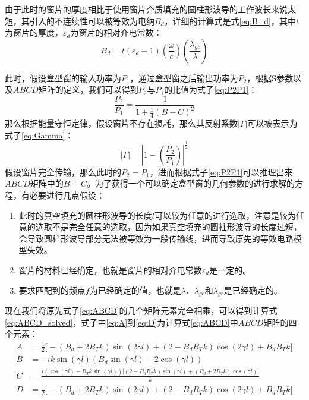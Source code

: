 \documentclass[master]{thesis-uestc}
\begin{document}
由于此时的窗片的厚度相比于使用窗片介质填充的圆柱形波导的工作波长来说太短，其引入的不连续性可以被等效为电纳$B_{d}$，详细的计算式是式\ref{eq:B_d}，其中$t$为窗片的厚度，$\varepsilon_d$为窗片的相对介电常数：
\begin{equation}\label{eq:B_d}
    B_{d} = t (\varepsilon_d - 1) \left( \frac{\omega}{c} \right) \left( \frac{\lambda_{gc}}{\lambda} \right)
\end{equation}

此时，假设盒型窗的输入功率为$P_{1}$，通过盒型窗之后输出功率为$P_{2}$，根据S参数以及$ABCD$矩阵的定义，我们可以得到$P_{2}$与$P_{1}$的比值为式子\ref{eq:P2P1}：
\begin{equation}\label{eq:P2P1}
    \frac{P_{2}}{P_{1}} = \frac{1}{1+\frac{1}{4} (B-C)^2}
\end{equation}
那么根据能量守恒定律，假设窗片不存在损耗，那么其反射系数$|\Gamma|$可以被表示为式子\ref{eq:Gamma}：
\begin{equation}\label{eq:Gamma}
    |\Gamma| = \left| 1 - \left( \frac{P_{2}}{P_{1}} \right) \right|^{\frac{1}{2}}
\end{equation}
假设窗片完全传输，那么此时的$P_{2}=P_{1}$，进而根据式子\ref{eq:P2P1}可以推理出来$ABCD$矩阵中的$B=C$。为了获得一个可以确定盒型窗的几何参数的进行求解的方程，有必要进行几点假设：
\begin{enumerate}
    \item 此时的真空填充的圆柱形波导的长度$l$可以较为任意的进行选取，注意是较为任意的选取不是完全任意的选取，因为如果真空填充的圆柱形波导的长度过短，会导致圆柱形波导部分无法被等效为一段传输线，进而导致原先的等效电路模型失效。
    \item 窗片的材料已经确定，也就是窗片的相对介电常数$\varepsilon_{d}$是一定的。
    \item 要求匹配到的频点$f$为已经确定的值，也就是$\lambda$、$\lambda_{gc}$和$\lambda_{gr}$是已经确定的。
\end{enumerate}


现在我们将原先式子\ref{eq:ABCD}的几个矩阵元素完全相乘，可以得到计算式\ref{eq:ABCD_solved}，式子中\ref{eq:A}到\ref{eq:D}为计算式\ref{eq:ABCD}中$ABCD$矩阵的四个元素：
\begin{subequations}\label{eq:ABCD_solved}
    \begin{align}
        A &= \frac{1}{2} \big[-(B_d + 2 B_T k) \sin(2\gamma l) + (2 - B_d B_T k)\cos(2\gamma l) + B_d B_T k \big] \label{eq:A} \\
        B &= -i k \sin(\gamma l) (B_d \sin(\gamma l) - 2 \cos(\gamma l)) \label{eq:B} \\
        C &= \frac{i (\cos(\gamma l) - B_T k \sin(\gamma l)) \big[(2 - B_d B_T k)\sin(\gamma l) + (B_d + 2 B_T k)\cos(\gamma l)\big]}{k} \label{eq:C} \\
        D &= \frac{1}{2} \big[-(B_d + 2 B_T k) \sin(2\gamma l) + (2 - B_d B_T k)\cos(2\gamma l) + B_d B_T k \big] \label{eq:D}
    \end{align}
\end{subequations}
\end{document}
